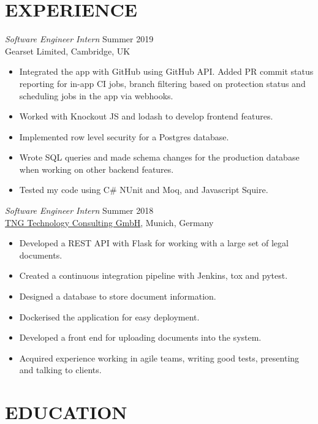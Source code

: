 \documentclass[margin, 10pt]{res} %
\begin{document}
\begin{resume}
 
\section{EXPERIENCE}

{\sl Software Engineer Intern} \hfill Summer 2019\\
Gearset Limited, Cambridge, UK

\begin{itemize} \itemsep -2pt
    \item Integrated the app with GitHub using GitHub API. Added PR commit status reporting for in-app CI jobs, branch filtering based on protection status and scheduling jobs in the app via webhooks.
    \item Worked with Knockout JS and lodash to develop frontend features.
    \item Implemented row level security for a Postgres database.
    \item Wrote SQL queries and made schema changes for the production database when working on other backend features.
    \item Tested my code using C\# NUnit and Moq, and Javascript Squire.
\end{itemize}
 
{\sl Software Engineer Intern} \hfill Summer 2018\\
\href{https://www.tngtech.com/en.html}{TNG Technology Consulting GmbH}, Munich, Germany

\begin{itemize} \itemsep -2pt
	\item Developed a REST API with Flask for working with a large set of legal documents.
    \item Created a continuous integration pipeline with Jenkins, tox and pytest.
    \item Designed a database to store document information.
    \item Dockerised the application for easy deployment.
    \item Developed a front end for uploading documents into the system.
    \item Acquired experience working in agile teams, writing good tests, presenting and talking to clients.
\end{itemize}

\section{EDUCATION}


\end{resume}
\end{document}
